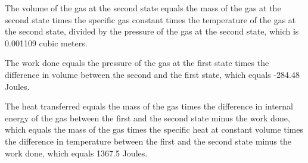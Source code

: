 The volume of the gas at the second state equals the mass of the gas at the second state times the specific gas constant times the temperature of the gas at the second state, divided by the pressure of the gas at the second state, which is 0.001109 cubic meters.

The work done equals the pressure of the gas at the first state times the difference in volume between the second and the first state, which equals -284.48 Joules.

The heat transferred equals the mass of the gas times the difference in internal energy of the gas between the first and the second state minus the work done, which equals the mass of the gas times the specific heat at constant volume times the difference in temperature between the first and the second state minus the work done, which equals 1367.5 Joules.